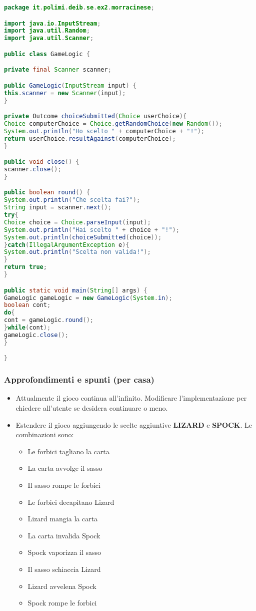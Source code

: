 \documentclass{article}
\begin{document}
\begin{lstlisting}[language=Java,escapechar=|]
package it.polimi.deib.se.ex2.morracinese;

import java.io.InputStream;
import java.util.Random;
import java.util.Scanner;

public class GameLogic {	

private final Scanner scanner;

public GameLogic(InputStream input) {
this.scanner = new Scanner(input);
}

private Outcome choiceSubmitted(Choice userChoice){
Choice computerChoice = Choice.getRandomChoice(new Random());
System.out.println("Ho scelto " + computerChoice + "!");
return userChoice.resultAgainst(computerChoice);
}

public void close() {
scanner.close();		
}

public boolean round() {
System.out.println("Che scelta fai?");
String input = scanner.next();
try{
Choice choice = Choice.parseInput(input);
System.out.println("Hai scelto " + choice + "!");
System.out.println(choiceSubmitted(choice));
}catch(IllegalArgumentException e){
System.out.println("Scelta non valida!");
}
return true; 
}

public static void main(String[] args) {
GameLogic gameLogic = new GameLogic(System.in);
boolean cont;
do{
cont = gameLogic.round();
}while(cont);
gameLogic.close();
}

}
\end{lstlisting}

\subsubsection{Approfondimenti e spunti (per casa)}

\begin{itemize}
	\item Attualmente il gioco continua all'infinito. Modificare l'implementazione per chiedere all'utente se desidera continuare o meno.
	\item Estendere il gioco aggiungendo le scelte aggiuntive \textbf{LIZARD} e \textbf{SPOCK}. Le combinazioni sono:
	\begin{itemize}
			\item Le forbici tagliano la carta
			\item La carta avvolge il sasso
			\item Il sasso rompe le forbici
			\item Le forbici decapitano Lizard
			\item Lizard mangia la carta
			\item La carta invalida Spock
			\item Spock vaporizza il sasso
			\item Il sasso schiaccia Lizard
			\item Lizard avvelena Spock
			\item Spock rompe le forbici
	\end{itemize}
\end{itemize}

\clearpage







\nocite{*}
\end{document}
